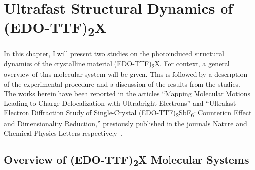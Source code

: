 
\chapter{Ultrafast Structural Dynamics of (EDO-TTF)\textsubscript{2}X}
\label{ch: UED-EDO}

In this chapter, I will present two studies on the photoinduced structural dynamics
of the crystalline material (EDO-TTF)\textsubscript{2}X. For context,
a general overview of this molecular system will be given. This is followed by a description
of the experimental procedure and a discussion of the results from the studies.
The works herein have been reported in the articles
``Mapping Molecular Motions Leading to Charge Delocalization with Ultrabright Electrons''
and ``Ultrafast Electron Diffraction Study of Single-Crystal
(EDO-TTF)\textsubscript{2}SbF\textsubscript{6}: Counterion Effect and Dimensionality Reduction,''
previously published in the journals Nature and Chemical Physics Letters respectively~\cite{Gao2013, Liu2017}.

\section{Overview of (EDO-TTF)\textsubscript{2}X Molecular Systems}
\label{sec: UED-EDO-overview}


